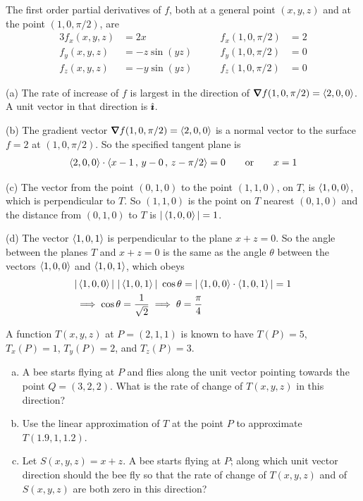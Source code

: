 \begin{solution}
The first order partial derivatives of $f$, both at a general point 
$(x,y,z)$ and at the point $(1, 0, \pi/2)$, are
\begin{alignat*}{3}
f_x(x,y,z)&= 2x\qquad &
     f_x(1, 0, \pi/2)&= 2 \\
f_y(x,y,z)&= -z\sin(yz)\qquad &
     f_y(1, 0, \pi/2)&= 0 \\
f_z(x,y,z)&= -y\sin(yz)\qquad &
     f_z(1, 0, \pi/2)&= 0 
\end{alignat*}

(a) The rate of increase of $f$ is largest in the direction of 
$\vnabla f(1, 0, \pi/2)=\llt 2,0,0\rgt$. A unit vector in that direction
is $\hat{\pmb{\imath}}$.

(b) The gradient vector $\vnabla f(1, 0, \pi/2)=\llt 2,0,0\rgt$ is a normal
vector to the surface $f=2$ at $(1, 0, \pi/2)$. So the specified tangent
plane is
\begin{align*}
\left< 2,0,0\right> \cdot \left< x-1\,,\,y-0\,,\,z-\pi/2\right>=0\qquad\text{or}\qquad
x=1
\end{align*} 

(c) The vector from the point $(0,1,0)$ to the point $(1,1,0)$, on $T$,
is $\left< 1,0,0\right>$, which is perpendicular to $T$. So $(1,1,0)$
is the point on $T$ nearest $(0,1,0)$  and the distance from $(0,1,0)$ to $T$
is $|\left< 1,0,0\right>|=1$.

(d) The vector $\left< 1,0,1\right>$ is perpendicular to the plane $x+z=0$.
So the angle between the planes $T$ and $x+z=0$ is the same as the angle
$\theta$ between the vectors $\left< 1,0,0\right>$ and $\left< 1,0,1\right>$,
which obeys
\begin{align*}
& |\left< 1,0,0\right>| \ |\left< 1,0,1\right>|\ \cos\theta 
   =|\left< 1,0,0\right>\cdot\left< 1,0,1\right>| 
   =1 \\
&\implies \cos\theta=\frac{1}{\sqrt{2}}
\implies  \theta=\frac{\pi}{4} 
\end{align*}
\end{solution}

\begin{question}[M200 2015D] %
A function $T(x,y,z)$ at $P = (2,1,1)$ is known to have 
$T(P) = 5$, $T_x (P) = 1$, $T_y(P) = 2$, and $T_z(P) = 3$.
\begin{enumerate}[(a)]
\item
A bee starts flying at $P$ and flies along the unit vector pointing 
towards the point $Q = (3,2,2)$. What is the rate of change of 
$T(x,y,z)$ in this direction?
\item
Use the linear approximation of $T$ at the point $P$ to approximate 
$T(1.9,1,1.2)$.
\item
Let $S(x,y,z) = x + z$. A bee starts flying at $P$; along which unit 
vector direction should the bee fly so that the rate of change of $T(x,y,z)$ 
and of $S(x,y,z)$ are both zero in this direction?
\end{enumerate}
\end{question}

